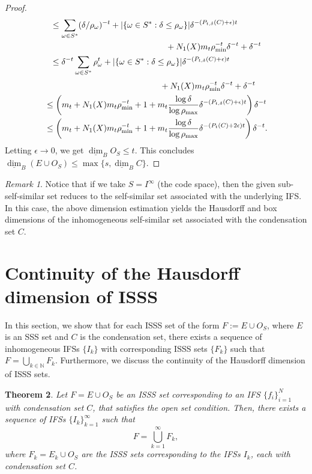 \documentclass[12pt,oneside,reqno]{amsart}
\newtheorem{theorem}{Theorem}[section]
\theoremstyle{definition}
\theoremstyle{remark}
\newtheorem{remark}[theorem]{Remark}
\begin{document}
\begin{proof}
\[\begin{aligned}
    &\le \sum_{\omega \in S^*} (\delta / \rho_\omega)^{-t} + |\{\omega \in S^* : \delta \le \rho_\omega\}| \delta^{-(P_{t, \delta}(C) + \epsilon)t} \\
    &\quad \hspace{4.5cm}+ N_1(X) m_t \rho_{\min}^{-t} \delta^{-t} + \delta^{-t} \\
    &\le \delta^{-t} \sum_{\omega \in S^*} \rho_\omega^t + |\{\omega \in S^* : \delta \le \rho_\omega\}| \delta^{-(P_{t, \delta}(C) + \epsilon)t} \\
     \end{aligned}\]
    \[ \begin{aligned}
    &\quad \hspace{4.5cm}+ N_1(X) m_t \rho_{\min}^{-t} \delta^{-t} + \delta^{-t} \\
    &\le \left( m_t + N_1(X) m_t \rho_{\min}^{-t} + 1 + m_t \frac{\log \delta}{\log \rho_{\max}} \delta^{-(P_{t, \delta}(C) + \epsilon)t} \right) \delta^{-t} \\
    &\le \left( m_t + N_1(X) m_t \rho_{\min}^{-t} + 1 + m_t \frac{\log \delta}{\log \rho_{\max}} \delta^{-(P_{t}(C) + 2\epsilon)t} \right) \delta^{-t}.
\end{aligned}
\]
Letting \(\epsilon \to 0\), we get \(\underline{\dim}_B O_S \le t\). This concludes \(\underline{\dim}_B (E \cup O_S) \le \max\{s, \underline{\dim}_B C\}\).

\end{proof}
\begin{remark}
Notice that if we take $S = I^{\infty}$ (the code space), then the given sub-self-similar set reduces to the self-similar set associated with the underlying IFS. In this case, the above dimension estimation yields the Hausdorff and box dimensions of the inhomogeneous self-similar set associated with the condensation set $C$.
\end{remark}


\section{Continuity of the Hausdorff dimension of ISSS}
In this section, we show that for each ISSS set of the form  $F:= E \cup O_S$, where $E$ is an SSS set and $C$ is the condensation set, there exists a sequence of inhomogeneous IFSs $\{I_k\}$ with corresponding ISSS sets $\{F_k\}$ such that $F = \bigcup_{k \in \mathbb{N}} F_k$. Furthermore, we discuss the continuity of the Hausdorff dimension of ISSS sets.
 
\begin{theorem} \label{thm000}
Let $F = E \cup O_S$ be an ISSS set corresponding to an IFS $\{f_i\}_{i=1}^N$ with condensation set $C$, that satisfies the open set condition. Then, there exists a sequence of IFSs $\{I_k\}_{k=1}^{\infty}$ such that
\[
F = \bigcup_{k=1}^{\infty} F_k,
\]
where $F_k = E_k \cup O_S$ are the ISSS sets corresponding to the IFSs $I_k$, each with condensation set $C$.
\end{theorem}
\end{document}
